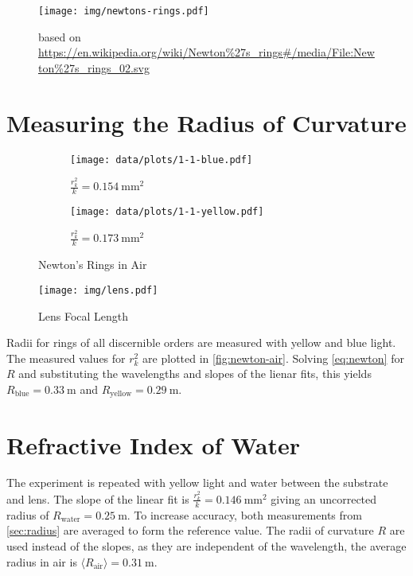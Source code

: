 \begin{figure}[tbp]
	\centering
	\texttt{[image: img/newtons-rings.pdf]}
	\caption{Newton's Rings}
	\label{fig:newton}
	\caption*{based on \url{https://en.wikipedia.org/wiki/Newton\%27s_rings\#/media/File:Newton\%27s_rings_02.svg}}
\end{figure}

\section{Measuring the Radius of Curvature}\label{sec:radius}

\begin{figure}[tbp]
	\centering
	\begin{subfigure}{.49\textwidth}
		\centering
		\texttt{[image: data/plots/1-1-blue.pdf]}
		\caption{Blue LED (\SI{465}{\nm})}
		\caption*{$\frac{r_k^2}{k} = \SI{0.154}{\mm\squared}$}
	\end{subfigure}
	\begin{subfigure}{.49\textwidth}
		\centering
		\texttt{[image: data/plots/1-1-yellow.pdf]}
		\caption{Yellow LED (\SI{590}{\nm})}
		\caption*{$\frac{r_k^2}{k} = \SI{0.173}{\mm\squared}$}
	\end{subfigure}
	\caption{Newton's Rings in Air}
	\label{fig:newton-air}
\end{figure}

\begin{figure}[tbp]
	\centering
	\texttt{[image: img/lens.pdf]}
	\caption{Lens Focal Length}
	\label{fig:lens}
\end{figure}

Radii for rings of all discernible orders are measured with yellow and blue light.
The measured values for $r_k^2$ are plotted in \autoref{fig:newton-air}.
Solving \autoref{eq:newton} for $R$ and substituting the wavelengths and slopes of the lienar fits, this yields $R_\text{blue} = \SI{0.33}{\meter}$ and $R_\text{yellow} = \SI{0.29}{\meter}$.

\section{Refractive Index of Water}

The experiment is repeated with yellow light and water between the substrate and lens.
The slope of the linear fit is $\frac{r_k^2}{k} = \SI{0.146}{\mm\squared}$ giving an uncorrected radius of $R_\text{water} = \SI{0.25}{\meter}$.
To increase accuracy, both measurements from \autoref{sec:radius} are averaged to form the reference value.
The radii of curvature $R$ are used instead of the slopes, as they are independent of the wavelength, the average radius in air is $\langle R_\text{air} \rangle = \SI{0.31}{\meter}$.

